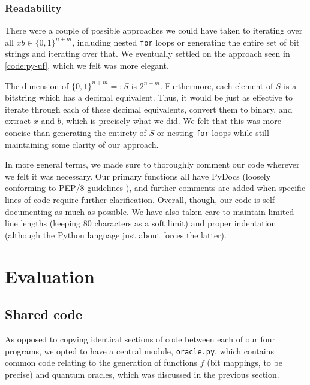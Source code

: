 \documentclass[12pt]{article}
\begin{document}


\subsubsection{Readability}

There were a couple of possible approaches we could have taken to iterating over all $xb \in \{0,1\}^{n+m}$, including nested \texttt{for} loops or generating the entire set of bit strings and iterating over that.
We eventually settled on the approach seen in \autoref{code:py-uf}, which we felt was more elegant.

The dimension of $\{0,1\}^{n+m} =: S$ is $2^{n+m}$.
Furthermore, each element of $S$ is a bitstring which has a decimal equivalent.
Thus, it would be just as effective to iterate through each of these decimal equivalents, convert them to binary, and extract $x$ and $b$, which is precisely what we did.
We felt that this was more concise than generating the entirety of $S$ or nesting \texttt{for} loops while still maintaining some clarity of our approach.

In more general terms, we made sure to thoroughly comment our code wherever we felt it was necessary.
Our primary functions all have PyDocs (loosely conforming to PEP/8 guidelines \cite{pep8}), and further comments are added when specific lines of code require further clarification.
Overall, though, our code is self-documenting as much as possible.
We have also taken care to maintain limited line lengths (keeping 80 characters as a soft limit) and proper indentation (although the Python language just about forces the latter).

\section{Evaluation}

\subsection{Shared code}
As opposed to copying identical sections of code between each of our four programs, we opted to have a central module, \texttt{oracle.py}, which contains common code relating to the generation of functions $f$ (bit mappings, to be precise) and quantum oracles, which was discussed in the previous section.
\end{document}
